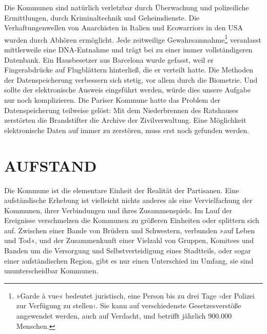Die Kommunen sind natürlich verletzbar durch Überwachung und
polizeiliche Ermittlungen, durch Kriminaltechnik und
Geheimdienste. Die Verhaftungenwellen von Anarchisten in Italien
und Ecowarriors in den USA wurden durch Abhören ermöglicht. Jede
zeitweilige Gewahrsamnahme\footnote{
»Garde à vue« bedeutet juristisch, eine Person bis zu drei Tage
›der Polizei zur Verfügung zu stellen‹. Sie kann auf verschiedenste
Gesetzesverstöße angewendet werden, auch auf Verdacht, und betrifft
jährlich 900.000 Menschen.
}
veranlasst mittlerweile eine
DNA-Entnahme und trägt bei zu einer immer vollständigeren
Datenbank. Ein Hausbesetzer aus Barcelona wurde gefasst, weil er
Fingerabdrücke auf Flugblättern hinterließ, die er verteilt hatte.
Die Methoden der Datenspeicherung verbessern sich stetig, vor allem
durch die Biometrie. Und sollte der elektronische Ausweis
eingeführt werden, würde dies unsere Aufgabe nur noch komplizieren.
Die Pariser Kommune hatte das Problem der Datenspeicherung
teilweise gelöst: Mit dem Niederbrennen des Ratshauses zerstörten
die Brandstifter die Archive der Zivilverwaltung. Eine Möglichkeit
elektronische Daten auf immer zu zerstören, muss erst noch gefunden
werden.

\section{AUFSTAND}

Die Kommune ist die elementare Einheit der Realität der Partisanen.
Eine aufständische Erhebung ist vielleicht nichts anderes als eine
Vervielfachung der Kommunen, ihrer Verbindungen und ihres
Zusammenspiels. Im Lauf der Ereignisse verschmelzen die Kommunen zu
größeren Einheiten oder splittern sich auf. Zwischen einer Bande
von Brüdern und Schwestern, verbunden »auf Leben und Tod«, und der
Zusammenkunft einer Vielzahl von Gruppen, Komitees und Banden um
die Versorgung und Selbstverteidigung eines Stadtteils, oder sogar
einer aufständischen Region, gibt es nur einen Unterschied im
Umfang, sie sind ununterscheidbar Kommunen.
\extrapar{}

